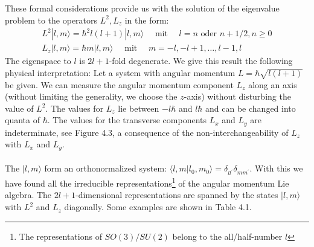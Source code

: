 These formal considerations provide us with the solution of the eigenvalue problem to the operators $L^2, L_z$ in the form:
\begin{equation}
\begin{array}{l}{L^{2}|l, m\rangle=\hbar^{2} l(l+1)|l, m\rangle \quad \text { mit } \quad l=n \text { oder } n+1 / 2, n \geq 0} \\ {L_{z}|l, m\rangle=\hbar m|l, m\rangle \quad \text { mit } \quad m=-l,-l+1, \ldots, l-1, l}\end{array}
\end{equation}
The eigenspace to $l$ is $2l + 1$-fold degenerate. We give this result the following physical interpretation: Let a system with angular momentum $L = \hbar\sqrt{l (l + 1)}$ be given. We can measure the angular momentum component $L_z$ along an axis (without limiting the generality, we choose the $z$-axis) without disturbing the value of $L^2$. The values ​​for $L_z$ lie between $-l \hbar$ and $l \hbar$ and can be changed into quanta of $\hbar$. The values ​​for the transverse components $L_x$ and $L_y$ are indeterminate, see Figure 4.3, a consequence of the non-interchangeability of $L_z$ with $L_x$ and $L_y$.\\\\
The $| l, m\rangle$ form an orthonormalized system: $\langle l, m | l_0, m_0 \rangle = \delta_{ll^{\prime}}\delta_{mm^{\prime}}$. With this we have found all the irreducible representations\footnote{The representations of $SO (3) / SU (2)$ belong to the all/half-number $l$} of the angular momentum Lie algebra. The $2l + 1$-dimensional representations are spanned by the states ${| l, m\rangle}$ with $L^2$ and $L_z$ diagonally. Some examples are shown in Table 4.1.

